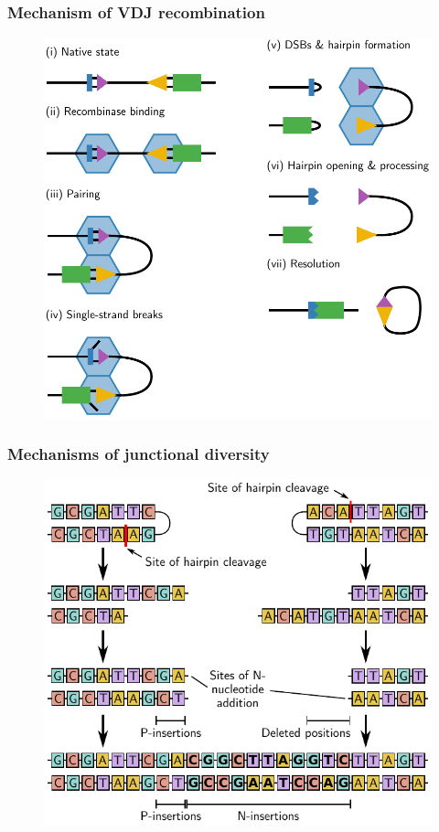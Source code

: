 \documentclass[presentation]{beamer}
\newlength{\slideheight}
\begin{document}
\begin{frame}
\frametitle{Mechanism of VDJ recombination}
\begin{figure}
\centering
\includegraphics[height=\slideheight]{figs/pdf/extra/vdj-recombination-mechanism}
\end{figure}
\end{frame}

\begin{frame}
\frametitle{Mechanisms of junctional diversity}
\begin{figure}
\centering
\includegraphics[height=\slideheight]{figs/pdf/extra/junctional-diversity-mechanism}
\end{figure}
\end{frame}
\end{document}
